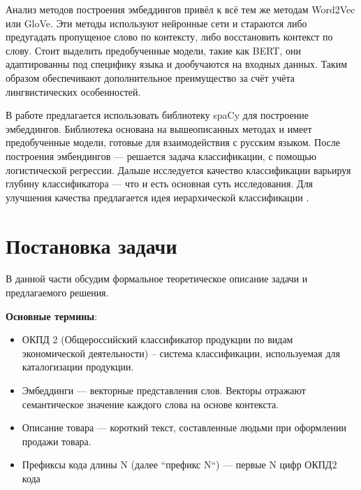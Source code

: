 \documentclass{article}
\begin{document}
Анализ методов построения эмбеддингов \cite{liu2018word} \cite{bird2009natural} привёл к всё тем же методам Word2Vec\cite{Church2017}\cite{DiGennaro2021} или GloVe\cite{munozWordEmbeddings}.  Эти методы используют нейронные сети и стараются либо предугадать пропущеное слово по контексту, либо восстановить контекст по слову.  Стоит выделить предобученные модели, такие как BERT, они адаптированны под специфику языка \cite{Lee2022Transformer} и дообучаются на входных данных. Таким образом обеспечивают дополнительное преимущество за счёт учёта лингвистических особенностей.

В работе предлагается использовать библиотеку spaCy\cite{spacy2} для построение эмбеддингов. Библиотека основана на вышеописанных методах и имеет предобученные модели, готовые для взаимодействия с русским языком. После построения эмбендингов --- решается задача классификации, с помощью логистической регрессии. Дальше исследуется качество классификации варьируя глубину классификатора --- что и есть основная суть исследования. Для улучшения качества предлагается идея иерархической классификации \cite{JStextclass2022} \cite{versley2006hierarchical} \cite{sebastiani2020hierarchical}.

\section{Постановка задачи}

В данной части обсудим формальное теоретическое описание задачи  и предлагаемого решения.

\textbf{Основные термины}:
\begin{itemize}
    \item ОКПД 2 (Общероссийский классификатор продукции по видам экономической деятельности) -- система классификации, используемая для каталогизации продукции.
    \item Эмбеддинги --- векторные представления слов. Векторы отражают семантическое значение каждого слова на основе контекста.
    \item Описание товара --- короткий текст, составленные людьми при оформлении продажи товара.
    \item Префиксы кода длины N (далее ``префикс N``) --- первые N цифр ОКПД2 кода
\end{itemize}
\end{document}
